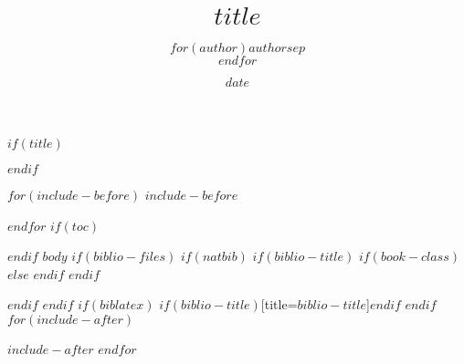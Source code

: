 \documentclass[fontsize=11pt]{scrartcl}
\title{$title$}
\author{$for(author)$$author$$sep$\\$endfor$}
\date{$date$}
\begin{document}
$if(title)$
\maketitle
$endif$

$for(include-before)$
$include-before$

$endfor$
$if(toc)$
\tableofcontents

$endif$
$body$
$if(biblio-files)$
$if(natbib)$
$if(biblio-title)$
$if(book-class)$
\renewcommand\bibname{$biblio-title$}
$else$
\renewcommand\refname{$biblio-title$}
$endif$
$endif$

$endif$
$endif$
$if(biblatex)$
\printbibliography$if(biblio-title)$[title=$biblio-title$]$endif$
$endif$
$for(include-after)$

$include-after$
$endfor$
\end{document}
